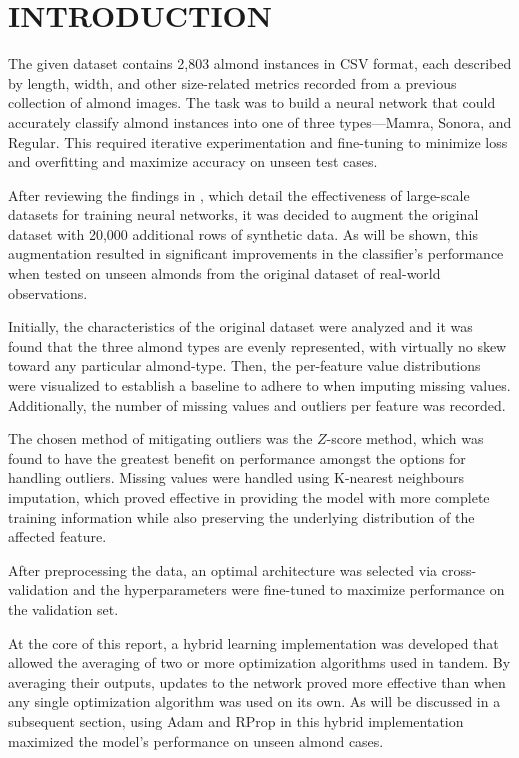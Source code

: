 \section{INTRODUCTION}

The given dataset contains 2,803 almond instances in CSV format, each described by length, width, and other size-related metrics recorded from a 
previous collection of almond images. The task was to build a neural network that could accurately classify almond 
instances into one of three types—Mamra, Sonora, and Regular. This required iterative experimentation and fine-tuning to minimize loss and overfitting 
and maximize accuracy on unseen test cases.

After reviewing the findings in \cite{sun2017revisitingunreasonableeffectivenessdata}, which detail the effectiveness of large-scale datasets 
for training neural networks, it was decided to augment the original dataset with 20,000 additional rows of synthetic data. As will be shown, 
this augmentation resulted in significant improvements in the classifier's performance when tested 
on unseen almonds from the original dataset of real-world observations.

Initially, the characteristics of the original dataset were analyzed and it was found that the three almond types are evenly represented, 
with virtually no skew toward any particular almond-type. Then, the per-feature value distributions were visualized to establish a baseline to adhere to
when imputing missing values. Additionally, the number of missing values and outliers per feature was recorded.

The chosen method of mitigating outliers was the $Z$-score method, which was found to have the greatest benefit on performance amongst the
options for handling outliers. Missing values 
were handled using K-nearest neighbours imputation, which proved effective in providing the model with more complete training information while 
also preserving the underlying distribution of the affected feature.

After preprocessing the data, an optimal architecture was selected via cross-validation and the hyperparameters were fine-tuned to maximize 
performance on the validation set.

At the core of this report, a hybrid learning implementation was developed that allowed the averaging of two or more optimization algorithms used in tandem. 
By averaging their outputs, updates to the network proved more effective than when any single optimization algorithm was used on its own. 
As will be discussed in a subsequent section, using Adam and RProp in this hybrid implementation maximized the model's performance on unseen almond cases.

